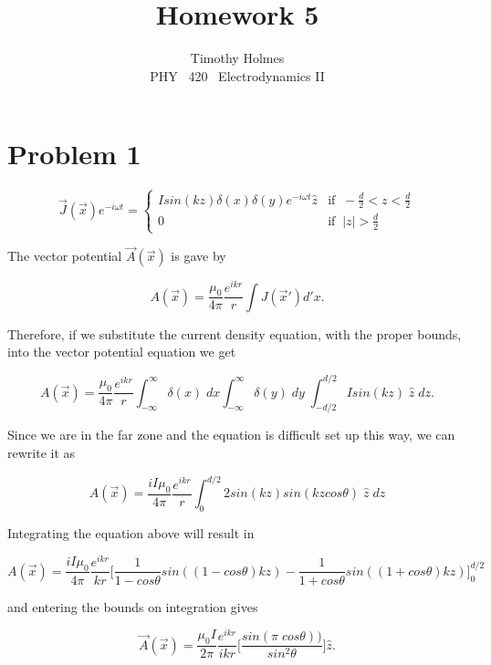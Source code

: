 \documentclass[11pt]{article}
\newcommand{\HWnum}{5}
\newcommand{\CourseNum}{420}           %
\newcommand{\Subject}{PHY}
\begin{document}

\title{Homework {\HWnum}}
\author{Timothy Holmes \\ \Subject ~ \CourseNum ~ Electrodynamics II}

\maketitle

\section*{Problem 1}


\[ \vec{J}(\vec{x})e^{-i \omega t} = 
   \begin{cases} 
       I sin(kz)\delta(x)\delta(y)e^{-i\omega t}\hat{z} & \text{if} \;\; -\frac{d}{2} < z < \frac{d}{2} \\
       0 & \text{if} \;\; |z| > \frac{d}{2}
   \end{cases}
\]

The vector potential $\vec{A}(\vec{x})$ is gave by

$$
A(\vec{x}) = \frac{\mu_{0}}{4\pi} \frac{e^{ikr}}{r} \int J(\vec{x}') d'x.
$$

Therefore, if we substitute the current density equation, with the proper bounds, into the vector potential equation we get

$$
A(\vec{x}) = \frac{\mu_{0}}{4\pi} \frac{e^{ikr}}{r} \int_{-\infty}^{\infty} \delta(x) \; dx \int_{-\infty}^{\infty} \delta(y) \; dy \; \int_{-d/2}^{d/2} I sin(kz) \; \hat{z} \; dz.
$$

Since we are in the far zone and the equation is difficult set up this way, we can rewrite it as 

$$
A(\vec{x}) = \frac{i I \mu_{0}}{4\pi} \frac{e^{ikr}}{r} \int_{0}^{d/2} 2sin(kz)sin(kz cos \theta) \; \hat{z} \; dz
$$

Integrating the equation above will result in

$$
A(\vec{x}) = \frac{i I \mu_{0}}{4\pi} \frac{e^{ikr}}{kr} \Bigg[ \frac{1}{1-cos \theta}sin((1 - cos \theta) kz) - \frac{1}{1+cos \theta} sin((1 + cos \theta) kz) \Bigg]_{0}^{d/2}
$$

and entering the bounds on integration gives

$$
\vec{A}(\vec{x}) = \frac{\mu_{0} I}{2\pi} \frac{e^{ikr}}{ikr} \Bigg[ \frac{sin(\pi \; cos \theta))}{sin^{2} \theta} \Bigg]\hat{z}.
$$

\clearpage
\end{document}
